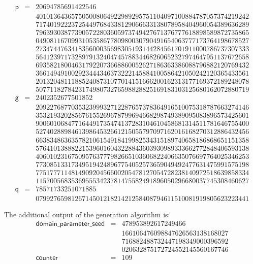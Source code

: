 \documentclass[a4paper]{article}
\begin{document}
\[
\begin{array}{lcr}
\textsf{p}&=&20694785691422546\\
&&401013643657505008064922989295751104097100884787057374219242\\
&&717401922237254497684338129066633138078958404960054389636289\\
&&796393038773905722803605973749427671376777618898589872735865\\
&&049081167099310535867780980030790491654063777173764198678527\\
&&273474476341835600035698305193144284561701911000786737307333\\
&&564123971732897913240474578834468260652327974647951137672658\\
&&693582180046317922073668860052627186363386088796882120769432\\
&&366149491002923444346373222145884100586421050242120365433561\\
&&201320481118852408731077014151666200162313177169372189248078\\
&&507711827842317498073276598828825169183103125680162072880719\\
\textsf{g}&=&2402352677501852\\
&&209227687703532399932712287657378364916510075318787663274146\\
&&353219320285676155269678799694668298749389095083896573425601\\
&&900601068477164491735474137283104610458681314511781646755400\\
&&527402889846139864532661215055797097162016168270312886432456\\
&&663834863635782106154918419982534315189740658186868651151358\\
&&576410138882215396016043228843603930989333662772848406593138\\
&&406010231675095763777982665103606822406635076697764025346253\\
&&773085133173495194248967754052573659049492477631475991575198\\
&&775177711481490920456600205478127054728238140972518639858334\\
&&115700568353695553423781475582491896050296680037745308460627\\
\textsf{q}&=&78571733251071885\\
&&079927659812671450121821421258408794611510081919805623223441
\end{array}
\]

The additional output of the generation algorithm is:
\[
\begin{array}{lcr}
\textsf{domain\_parameter\_seed}&=&478953892617249466\\
&&166106476098847626563138168027\\
&&716882488732447198349000396592\\
&&020632875172724552145560167746\\
\textsf{counter}&=&109
\end{array}
\]
\end{document}
